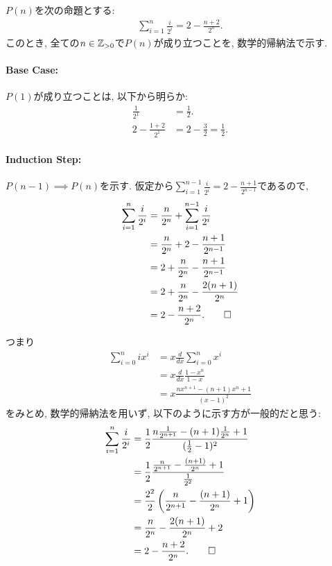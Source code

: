 \begin{proof*}
  $P(n)$を次の命題とする:
  \begin{align*}
    \sum_{i=1}^n\frac{i}{2^i}=2-\frac{n+2}{2^n}.
  \end{align*}
  このとき,
  全ての$n\in\mathbb{Z}_{>0}$で$P(n)$が成り立つことを,
  数学的帰納法で示す.

  \paragraph{Base Case:}
  $P(1)$が成り立つことは, 以下から明らか:
  \begin{align*}
    \frac{1}{2^1}&=\frac{1}{2}.\\
    2-\frac{1+2}{2^1}&=2-\frac{3}{2}=\frac{1}{2}.
    \end{align*}

  \paragraph{Induction Step:}
  $P(n-1)\implies P(n)$を示す.
  仮定から$\sum_{i=1}^{n-1}\frac{i}{2^i}=2-\frac{n+1}{2^{n-1}}$であるので,
  \begin{align*}
    \sum_{i=1}^n\frac{i}{2^i}
    &=\frac{n}{2^n}+\sum_{i=1}^{n-1}\frac{i}{2^i}\\
    &=\frac{n}{2^n}+2-\frac{n+1}{2^{n-1}}\\
    &=2+\frac{n}{2^n}-\frac{n+1}{2^{n-1}}\\
    &=2+\frac{n}{2^n}-\frac{2(n+1)}{2^{n}}\\
    &=2-\frac{n+2}{2^n}
    .\qedhere
  \end{align*}
\end{proof*}
\begin{rem}
  つまり
  \begin{align*}
    \sum_{i=0}^{n}ix^{i}
    &=x\frac{d}{dx}\sum_{i=0}^{n}x^{i}\\
    &=x\frac{d}{dx}\frac{1-x^n}{1-x}\\
    &=x\frac{nx^{n+1}-(n+1)x^n+1}{(x-1)^2}
  \end{align*}
  をみとめ,
  数学的帰納法を用いず, 以下のように示す方が一般的だと思う:
  \begin{align*}
    \sum_{i=1}^n\frac{i}{2^i}
    &=
    \frac{1}{2}\frac{n\frac{1}{2^{n+1}}-(n+1)\frac{1}{2^n}+1}{(\frac{1}{2}-1)^2}\\
    &=
    \frac{1}{2}\frac{\frac{n}{2^{n+1}}-\frac{(n+1)}{2^n}+1}{\frac{1}{2^2}}\\
    &=
    \frac{2^2}{2}\left(\frac{n}{2^{n+1}}-\frac{(n+1)}{2^n}+1\right)\\
    &=
    \frac{n}{2^{n}}-\frac{2(n+1)}{2^n}+2\\
    &=
    2-\frac{n+2}{2^n}
    .\qedhere
  \end{align*}
\end{rem}



